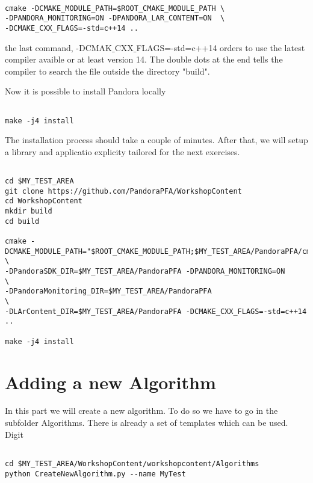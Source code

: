 \begin{verbatim}

cmake -DCMAKE_MODULE_PATH=$ROOT_CMAKE_MODULE_PATH \
-DPANDORA_MONITORING=ON -DPANDORA_LAR_CONTENT=ON  \
-DCMAKE_CXX_FLAGS=-std=c++14 ..

\end{verbatim}

the last command, -DCMAK${\_}$CXX${\_}$FLAGS=-std=c++14 orders to use the latest compiler avaible or at least version 14. The double dots at the end tells the compiler to search the file outside the directory "build".

Now it is possible to install Pandora locally

\begin{verbatim}

make -j4 install

\end{verbatim}

The installation process should take a couple of minutes. After that, we will setup a library and applicatio explicity tailored for the next exercises.

\begin{verbatim}

cd $MY_TEST_AREA
git clone https://github.com/PandoraPFA/WorkshopContent
cd WorkshopContent
mkdir build
cd build

cmake -DCMAKE_MODULE_PATH="$ROOT_CMAKE_MODULE_PATH;$MY_TEST_AREA/PandoraPFA/cmakemodules" \
-DPandoraSDK_DIR=$MY_TEST_AREA/PandoraPFA -DPANDORA_MONITORING=ON                         \
-DPandoraMonitoring_DIR=$MY_TEST_AREA/PandoraPFA                                          \
-DLArContent_DIR=$MY_TEST_AREA/PandoraPFA -DCMAKE_CXX_FLAGS=-std=c++14 ..

make -j4 install

\end{verbatim}

\section{Adding a new Algorithm} \label{sssec:new_algorithm}

In this part we will create a new algorithm. To do so we have to go in the subfolder Algorithms. There is already a set of templates which can be used. Digit

\begin{verbatim}

cd $MY_TEST_AREA/WorkshopContent/workshopcontent/Algorithms
python CreateNewAlgorithm.py --name MyTest

\end{verbatim}

